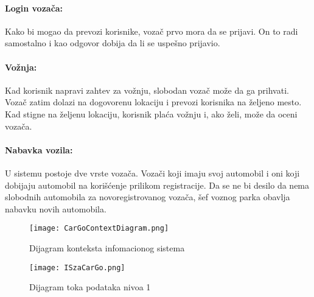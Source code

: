 \paragraph{Login vozača:}
    Kako bi mogao da prevozi korisnike, vozač prvo mora da se prijavi. On to radi samostalno i kao odgovor dobija da li se uspešno prijavio.
\paragraph{Vožnja:}
    Kad korisnik napravi zahtev za vožnju, slobodan vozač može da ga prihvati. Vozač zatim dolazi na dogovorenu lokaciju i prevozi korisnika na željeno mesto. Kad stigne na željenu lokaciju, korisnik plaća vožnju i, ako želi, može da oceni vozača.
\paragraph{Nabavka vozila:}
    U sistemu postoje dve vrste vozača. Vozači koji imaju svoj automobil i oni koji dobijaju automobil na korišćenje prilikom registracije. Da se ne bi desilo da nema slobodnih automobila za novoregistrovanog vozača, šef voznog parka obavlja nabavku novih automobila.

\begin{figure}[H]
\begin{center}
\texttt{[image: CarGoContextDiagram.png]}
\end{center}
    \caption{Dijagram konteksta infomacionog sistema}
\label{fig:CarGoContextDiagram}
\end{figure}

\begin{figure}[H]
\begin{center}
\texttt{[image: ISzaCarGo.png]}
\end{center}
    \caption{Dijagram toka podataka nivoa 1}
\label{fig:dtp1}
\end{figure}

